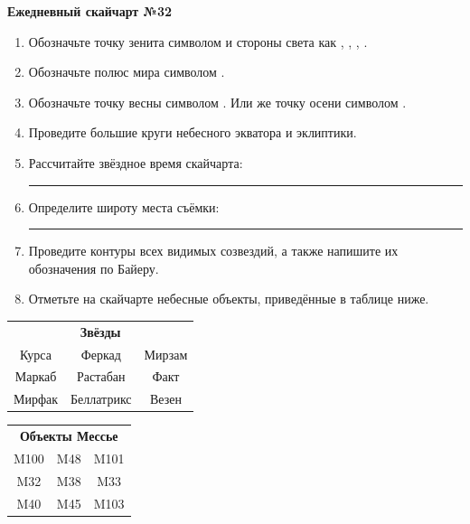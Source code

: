 \documentclass{./SAS-class-skygen}
\begin{document}
    
    
    
	\begin{center}
		\large\textbf{Ежедневный скайчарт №32}
	\end{center}

	\begin{enumerate}
		\item Обозначьте точку зенита символом  и стороны света как , , , .
		\item Обозначьте полюс мира символом .
		\item Обозначьте точку весны символом \Aries. Или же точку осени символом \Libra.
		\item Проведите большие круги небесного экватора и эклиптики.
		\item Рассчитайте звёздное время скайчарта: \rule{2cm}{0.4pt}
		\item Определите широту места съёмки: \rule{2cm}{0.4pt}
		\item Проведите контуры всех видимых созвездий, а также напишите их обозначения по Байеру.
		\item Отметьте на скайчарте небесные объекты, приведённые в таблице ниже.
	\end{enumerate}
	
    \vspace{0.5cm}

    \begin{table}[h!]
    \centering
    \begin{tabular}{ccc}
    \multicolumn{3}{c}{\textbf{Звёзды}} \\ Курса & Феркад & Мирзам \\
Маркаб & Растабан & Факт \\
Мирфак & Беллатрикс & Везен \\

\end{tabular}
    \hfill
    \begin{tabular}{ccc}
    \multicolumn{3}{c}{\textbf{Объекты Мессье}} \\ M100 & M48 & M101 \\
M32 & M38 & M33 \\
M40 & M45 & M103 \\

\end{tabular}
    \end{table}
	
\end{document}
